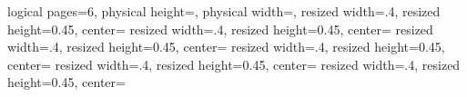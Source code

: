 \pgfpagesphysicalpageoptions%
{
logical pages=6,
physical height=\paperwidth,
physical width=\paperheight,
}
{
resized width=.4\pgfphysicalwidth,
resized height=0.45\pgfphysicalheight,
center=\pgfpoint{0.18\pgfphysicalwidth}{0.75\pgfphysicalheight}
}
{
resized width=.4\pgfphysicalwidth,
resized height=0.45\pgfphysicalheight,
center=\pgfpoint{.18\pgfphysicalwidth}{.25\pgfphysicalheight}
}
{
resized width=.4\pgfphysicalwidth,
resized height=0.45\pgfphysicalheight,
center=\pgfpoint{0.48\pgfphysicalwidth}{.75\pgfphysicalheight}
}
{
resized width=.4\pgfphysicalwidth,
resized height=0.45\pgfphysicalheight,
center=\pgfpoint{.48\pgfphysicalwidth}{.25\pgfphysicalheight}
}
{
resized width=.4\pgfphysicalwidth,
resized height=0.45\pgfphysicalheight,
center=\pgfpoint{.78\pgfphysicalwidth}{.75\pgfphysicalheight}
}
{
resized width=.4\pgfphysicalwidth,
resized height=0.45\pgfphysicalheight,
center=\pgfpoint{.78\pgfphysicalwidth}{.25\pgfphysicalheight}
}

